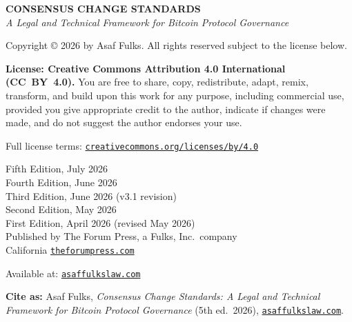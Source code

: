 \documentclass[11pt, twoside, openright]{book}
\begin{document}
\thispagestyle{empty}
\vspace*{1.0cm}
{\small
\begin{flushleft}
{\normalsize\bfseries CONSENSUS CHANGE STANDARDS}\\[4pt]
\textit{A Legal and Technical Framework for Bitcoin Protocol Governance}

\vspace{0.8cm}
Copyright \copyright{} 2026 by Asaf Fulks. All rights reserved subject to the license below.

\vspace{0.6cm}
\textbf{License: Creative Commons Attribution 4.0 International (CC~BY~4.0).} You are free to share, copy, redistribute, adapt, remix, transform, and build upon this work for any purpose, including commercial use, provided you give appropriate credit to the author, indicate if changes were made, and do not suggest the author endorses your use.

\vspace{0.4cm}
Full license terms: \href{https://creativecommons.org/licenses/by/4.0}{\nolinkurl{creativecommons.org/licenses/by/4.0}}

\vspace{0.8cm}
Fifth Edition, July 2026\\
Fourth Edition, June 2026\\
Third Edition, June 2026 (v3.1 revision)\\
Second Edition, May 2026\\
First Edition, April 2026 (revised May 2026)\\
Published by The Forum Press, a Fulks, Inc.~company\\
California \textbar{} \href{https://theforumpress.com}{\nolinkurl{theforumpress.com}}

\vspace{0.6cm}
Available at: \href{https://asaffulkslaw.com}{\nolinkurl{asaffulkslaw.com}}

\vspace{0.6cm}
\textbf{Cite as:} Asaf Fulks, \textit{Consensus Change Standards: A Legal and Technical Framework for Bitcoin Protocol Governance} (5th ed.~2026), \href{https://asaffulkslaw.com}{\nolinkurl{asaffulkslaw.com}}.


\end{flushleft}}
\end{document}
